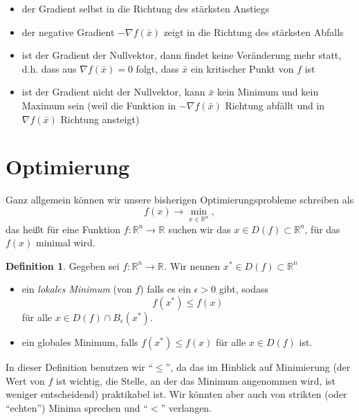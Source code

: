 \documentclass[]{book}
\providecommand{\tightlist}{%
  \setlength{\itemsep}{0pt}\setlength{\parskip}{0pt}}
\theoremstyle{definition}
\newtheorem{definition}{Definition}[chapter]
\theoremstyle{definition}
\theoremstyle{definition}
\theoremstyle{definition}
\theoremstyle{remark}
\begin{document}
\begin{itemize}
\tightlist
\item
  der Gradient selbst in die Richtung des stärksten Anstiegs
\item
  der negative Gradient \(-\nabla f(\bar x)\) zeigt in die Richtung des stärksten Abfalls
\item
  ist der Gradient der Nullvektor, dann findet keine Veränderung mehr statt, d.h. dass aus \(\nabla f(\bar x) =0\) folgt, dass \(\bar x\) ein kritischer Punkt von \(f\) ist
\item
  ist der Gradient nicht der Nullvektor, kann \(\bar x\) kein Minimum und kein Maximum sein (weil die Funktion in \(-\nabla f(\bar x)\) Richtung abfällt und in \(\nabla f(\bar x)\) Richtung ansteigt)
\end{itemize}

\hypertarget{optimierung-1}{%
\section{Optimierung}\label{optimierung-1}}

Ganz allgemein können wir unsere bisherigen Optimierungsprobleme schreiben als
\begin{equation*}
f(x) \to \min_{x\in \mathbb R^{n}},
\end{equation*}
das heißt für eine Funktion \(f\colon \mathbb R^n \to \mathbb R^{}\) suchen wir das \(x \in D(f) \subset \mathbb R^{n}\), für das \(f(x)\) minimal wird.

\begin{definition}

Gegeben sei \(f\colon \mathbb R^{n} \to \mathbb R^{}\). Wir nennen \(x^* \in D(f)\subset \mathbb R^{n}\)

\begin{itemize}
\item
  ein \emph{lokales Minimum} (von \(f\)) falls es ein \(\epsilon >0\) gibt, sodass
  \begin{equation*}
  f(x^*) \leq f(x)
  \end{equation*}
  für alle \(x \in D(f) \cap B_\epsilon (x^*)\).
\item
  ein globales Minimum, falls \(f(x^*) \leq f(x)\) für alle \(x\in D(f)\) ist.
\end{itemize}

\end{definition}

In dieser Definition benutzen wir ``\(\leq\)'', da das im Hinblick auf Minimierung (der Wert von \(f\) ist wichtig, die Stelle, an der das Minimum angenommen wird, ist weniger entscheidend) praktikabel ist. Wir könnten aber auch von strikten (oder ``echten'') Minima sprechen und ``\(<\)'' verlangen.
\end{document}
